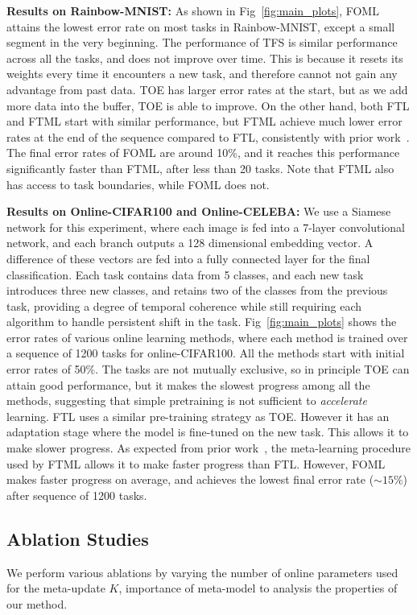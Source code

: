 \noindent \textbf{Results on Rainbow-MNIST:} As shown in Fig~\ref{fig:main_plots}, FOML attains the lowest error rate on most tasks in Rainbow-MNIST, except a small segment in the very beginning. The performance of TFS is similar performance across all the tasks, and does not improve over time. This is because it resets its weights every time it encounters a new task, and therefore cannot not gain any advantage from past data. TOE has larger error rates at the start, but as we add more data into the buffer, TOE is able to improve. On the other hand, both FTL and FTML start with similar performance, but FTML achieve much lower error rates at the end of the sequence compared to FTL, consistently with prior work~\citep{finn19a}. The final error rates of FOML are around 10\%, and it reaches this performance significantly faster than FTML, after less than 20 tasks. Note that FTML also has access to task boundaries, while FOML does not.

\noindent \textbf{Results on Online-CIFAR100 and Online-CELEBA:} We use a Siamese network for this experiment, where each image is fed into a 7-layer convolutional network, and each branch outputs a 128 dimensional embedding vector. A difference of these vectors are fed into a fully connected layer for the final classification. Each task contains data from 5 classes, and each new task introduces three new classes, and retains two of the classes from the previous task, providing a degree of temporal coherence while still requiring each algorithm to handle persistent shift in the task. Fig~\ref{fig:main_plots} shows the error rates of various online learning methods, where each method is trained over a sequence of 1200 tasks for online-CIFAR100. All the methods start with initial error rates of 50\%. The tasks are not mutually exclusive, so in principle TOE can attain good performance, but it makes the slowest progress among all the methods, suggesting that simple pretraining is not sufficient to \emph{accelerate} learning. FTL uses a similar pre-training strategy as TOE. However it has an adaptation stage where the model is fine-tuned on the new task. This allows it to make slower progress.
As expected from prior work~\citep{finn19a}, the meta-learning procedure used by FTML allows it to make faster progress than FTL. However, FOML makes faster progress on average, and achieves the lowest final error rate ($\sim15\%$) after sequence of 1200 tasks. 

\vspace{-0.2cm}
\subsection{Ablation Studies}
\vspace{-0.2cm}
We perform various ablations by varying the number of online parameters used for the meta-update $K$, importance of meta-model to analysis the properties of our method.


